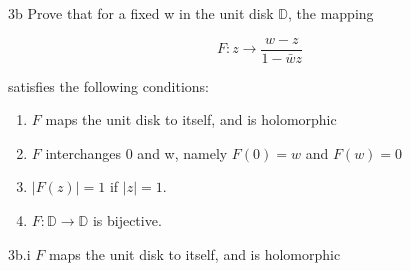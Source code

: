 \documentclass{article}
\begin{document}
\begin{PROB}{3b}\label{Problem 3b.}
    Prove that for a fixed w in the unit disk $\mathbb{D}$, the mapping

    \[F: z \to \frac{w - z}{1 - \bar{w}z}\]

    satisfies the following conditions:

    \begin{enumerate}
        \item $F$ maps the unit disk to itself, and is holomorphic
        \item $F$ interchanges 0 and w, namely $F(0) = w$ and $F(w) = 0$
        \item $|F(z)| = 1$ if $|z| = 1$.
        \item $F: \mathbb{D} \to \mathbb{D}$ is bijective. 
    \end{enumerate}
\end{PROB}
\begin{claim}{3b.i}\label{Claim 3bi.}
    $F$ maps the unit disk to itself, and is holomorphic
\end{claim}
\end{document}
